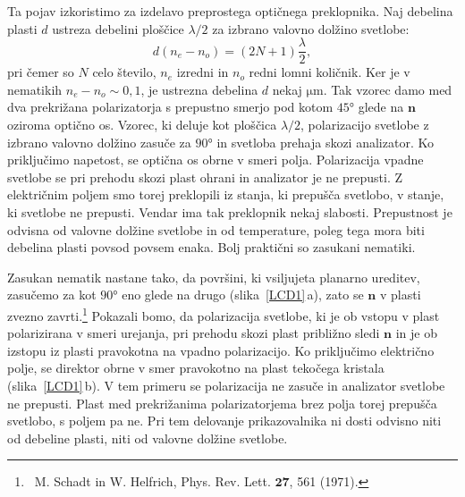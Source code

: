 Ta pojav izkoristimo za izdelavo preprostega optičnega preklopnika. 
Naj debelina plasti $d$ ustreza debelini ploščice $\lambda/2$ 
za izbrano valovno dolžino svetlobe:
\begin{equation}
d(n_{e}-n_{o})=(2N+1)\frac{\lambda}{2},
\label{7.57}
\end{equation}
pri čemer so $N$ celo število, $n_e$ izredni in $n_o$ redni 
lomni količnik. Ker je v nematikih $n_{e}-n_{o}\sim0,1$, 
je ustrezna debelina $d$ nekaj $\si{\micro\metre}$. Tak vzorec damo med dva prekrižana 
polarizatorja s prepustno smerjo pod kotom $45\si{\degree}$ glede na $\mathbf{n}$
oziroma optično os. Vzorec, ki deluje kot ploščica $\lambda/2$, 
polarizacijo svetlobe z izbrano valovno dolžino zasuče za $90\si{\degree}$ in 
svetloba prehaja skozi analizator. Ko
priključimo napetost, se optična os obrne v smeri polja. Polarizacija vpadne 
svetlobe se pri prehodu skozi plast ohrani in 
analizator je ne prepusti. Z električnim poljem smo torej preklopili iz
stanja, ki prepušča svetlobo, v stanje, ki svetlobe ne prepusti.
Vendar ima tak preklopnik nekaj slabosti. Prepustnost je odvisna
od valovne dolžine svetlobe in od temperature, poleg tega mora biti debelina 
plasti povsod povsem enaka. Bolj praktični so zasukani nematiki. 

Zasukan  nematik nastane tako, da površini, ki vsiljujeta planarno ureditev,
zasučemo za kot $90\si{\degree}$ eno glede na drugo (slika~\ref{LCD1}\,a), zato se $\mathbf{n}$ 
v plasti zvezno zavrti.\footnote{~M. 
Schadt in W. Helfrich, Phys. Rev. Lett. $\mathbf{27}$, 561 (1971).}
Pokazali bomo, da polarizacija svetlobe, ki je ob vstopu 
v plast polarizirana v smeri urejanja, pri prehodu skozi plast približno
sledi $\mathbf{n}$ in je ob izstopu iz plasti pravokotna
na vpadno polarizacijo. Ko priključimo električno polje, se direktor 
obrne v smer pravokotno na plast tekočega kristala (slika~\ref{LCD1}\,b). V tem primeru 
se polarizacija ne zasuče in analizator svetlobe ne prepusti. Plast med prekrižanima
polarizatorjema brez polja torej prepušča svetlobo, s poljem pa ne. Pri tem
delovanje prikazovalnika ni dosti odvisno niti od debeline plasti, niti
od valovne dolžine svetlobe. 

